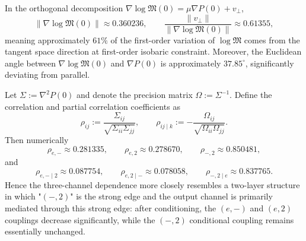 \begin{remark}\label{rem:real-input-40-vperp-angle}
In the orthogonal decomposition \(\nabla\log\mathfrak{M}(0)=\mu\nabla P(0)+v_\perp\),
\[
\|\nabla\log\mathfrak{M}(0)\|\approx 0.360236,\qquad
\frac{\|v_\perp\|}{\|\nabla\log\mathfrak{M}(0)\|}\approx 0.61355,
\]
meaning approximately \(61\%\) of the first-order variation of \(\log\mathfrak{M}\) comes from the tangent space direction at first-order isobaric constraint.
Moreover, the Euclidean angle between \(\nabla\log\mathfrak{M}(0)\) and \(\nabla P(0)\) is approximately \(37.85^\circ\), significantly deviating from parallel.
\end{remark}

\begin{proposition}\label{prop:real-input-40-precision-matrix-mediation}
Let \(\Sigma:=\nabla^2P(0)\) and denote the precision matrix \(\Omega:=\Sigma^{-1}\).
Define the correlation and partial correlation coefficients as
\[
\rho_{ij}:=\frac{\Sigma_{ij}}{\sqrt{\Sigma_{ii}\Sigma_{jj}}},
\qquad
\rho_{ij\mid k}:=-\frac{\Omega_{ij}}{\sqrt{\Omega_{ii}\Omega_{jj}}}.
\]
Then numerically
\[
\rho_{e,-}\approx 0.281335,\qquad
\rho_{e,2}\approx 0.278670,\qquad
\rho_{-,2}\approx 0.850481,
\]
and
\[
\rho_{e,-\mid 2}\approx 0.087754,\qquad
\rho_{e,2\mid -}\approx 0.078058,\qquad
\rho_{-,2\mid e}\approx 0.837765.
\]
Hence the three-channel dependence more closely resembles a two-layer structure in which "\((-,2)\)" is the strong edge and the output channel is primarily mediated through this strong edge: after conditioning, the \((e,-)\) and \((e,2)\) couplings decrease significantly, while the \((-,2)\) conditional coupling remains essentially unchanged.
\end{proposition}

